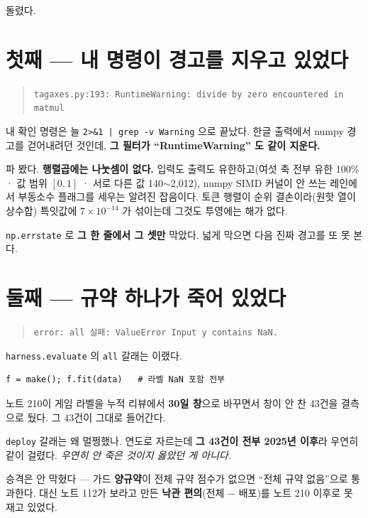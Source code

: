 \documentclass[10pt]{article}
\begin{document}
돌렸다.

\section{첫째 --- 내 명령이 경고를 지우고 있었다}

\begin{quote}\small
\texttt{tagaxes.py:193: RuntimeWarning: divide by zero encountered in matmul}
\end{quote}

내 확인 명령은 늘 \texttt{2>\&1 | grep -v Warning} 으로 끝났다. 한글 출력에서
numpy 경고를 걷어내려던 것인데, \textbf{그 필터가 ``RuntimeWarning'' 도 같이
지운다.}

파 봤다. \textbf{행렬곱에는 나눗셈이 없다.} 입력도 출력도 유한하고(여섯 축
전부 유한 100\% · 값 범위 $[0,1]$ · 서로 다른 값 140$\sim$2,012), numpy SIMD
커널이 안 쓰는 레인에서 부동소수 플래그를 세우는 알려진 잡음이다. 토큰
행렬이 순위 결손이라(원핫 열이 상수합) 특잇값에 $7{\times}10^{-14}$ 가 섞이는데
그것도 투영에는 해가 없다.

\texttt{np.errstate} 로 \textbf{그 한 줄에서 그 셋만} 막았다. 넓게 막으면
다음 진짜 경고를 또 못 본다.

\section{둘째 --- 규약 하나가 죽어 있었다}

\begin{quote}\small
\texttt{error: all 실패: ValueError Input y contains NaN.}
\end{quote}

\texttt{harness.evaluate} 의 \texttt{all} 갈래는 이랬다.

\begin{center}\small
\begin{verbatim}
f = make(); f.fit(data)   # 라벨 NaN 포함 전부
\end{verbatim}
\end{center}

노트 210이 게임 라벨을 누적 리뷰에서 \textbf{30일 창}으로 바꾸면서 창이 안 찬
43건을 결측으로 뒀다. 그 43건이 그대로 들어간다.

\texttt{deploy} 갈래는 왜 멀쩡했나. 연도로 자르는데 \textbf{그 43건이 전부
2025년 이후}라 우연히 같이 걸렸다. \emph{우연히 안 죽은 것이지 옳았던 게
아니다.}

승격은 안 막혔다 --- 가드 \textbf{양규약}이 전체 규약 점수가 없으면
``전체 규약 없음''으로 통과한다. 대신 노트 112가 보라고 만든 \textbf{낙관
편의}(전체 $-$ 배포)를 노트 210 이후로 못 재고 있었다.
\end{document}
